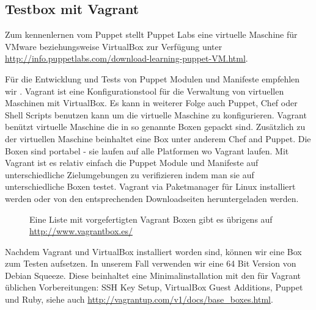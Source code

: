 \documentclass[12pt,a4paper,ngerman]{article}
\begin{document}



\subsection{Testbox mit Vagrant}
Zum kennenlernen vom Puppet stellt Puppet Labs eine virtuelle Maschine für VMware beziehungsweise VirtualBox zur Verfügung unter \url{http://info.puppetlabs.com/download-learning-puppet-VM.html}. 

Für die Entwicklung und Tests von Puppet Modulen und Manifeste empfehlen wir \cite{vagrant}. Vagrant ist eine Konfigurationstool für die Verwaltung von virtuellen Maschinen mit VirtualBox. Es kann in weiterer Folge auch Puppet, Chef oder Shell Scripts benutzen kann um die virtuelle Maschine zu konfigurieren. Vagrant benützt virtuelle Maschine die in so genannte Boxen gepackt sind. Zusätzlich zu der virtuellen Maschine beinhaltet eine Box unter anderem Chef and Puppet. Die Boxen sind portabel - sie laufen auf alle Platformen wo Vagrant laufen. Mit Vagrant ist es relativ einfach die Puppet Module und Manifeste auf unterschiedliche Zielumgebungen zu verifizieren indem man sie auf unterschiedliche Boxen testet. Vagrant via Paketmanager für Linux installiert werden oder von den entsprechenden Downloadseiten heruntergeladen werden.


\begin{figure}
\vspace{-15pt}
\begin{boxedminipage}{5cm}
Eine Liste mit vorgefertigten Vagrant Boxen gibt es übrigens auf \url{http://www.vagrantbox.es/}
\end{boxedminipage}
\vspace{-15pt}
\end{figure}

Nachdem Vagrant und VirtualBox installiert worden sind, können wir eine Box zum Testen aufsetzen. In unserem Fall verwenden wir eine 64 Bit Version von Debian Squeeze. Diese beinhaltet eine Minimalinstallation mit den für Vagrant üblichen Vorbereitungen: SSH Key Setup, VirtualBox Guest Additions, Puppet und Ruby, siehe auch \url{http://vagrantup.com/v1/docs/base_boxes.html}.
\end{document}
